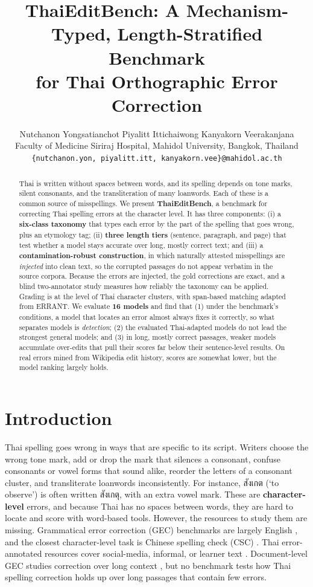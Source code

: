\documentclass[11pt]{article}
\title{ThaiEditBench: A Mechanism-Typed, Length-Stratified Benchmark\\
       for Thai Orthographic Error Correction}
\author{Nutchanon Yongsatianchot \quad Piyalitt Ittichaiwong \quad Kanyakorn Veerakanjana \\
        Faculty of Medicine Siriraj Hospital, Mahidol University, Bangkok, Thailand \\
        \texttt{\{nutchanon.yon, piyalitt.itt, kanyakorn.vee\}@mahidol.ac.th}}
\begin{document}
\maketitle

\begin{abstract}
Thai is written without spaces between words, and its spelling depends on tone marks, silent
consonants, and the transliteration of many loanwords. Each of these is a common source of
misspellings. We present \textbf{ThaiEditBench}, a benchmark for correcting Thai spelling errors
at the character level. It has three components: (i) a \textbf{six-class taxonomy} that types
each error by the part of the spelling that goes wrong, plus an etymology tag; (ii) \textbf{three
length tiers} (sentence, paragraph, and page) that test whether a model stays accurate over long,
mostly correct text; and (iii) a \textbf{contamination-robust construction}, in which naturally
attested misspellings are \emph{injected} into clean text, so the corrupted passages do not
appear verbatim in the source corpora.
Because the errors are injected, the gold corrections are exact, and a blind two-annotator study
measures how reliably the taxonomy can be applied. Grading is at the level of Thai character
clusters, with span-based matching adapted from ERRANT. We evaluate \textbf{16 models} and find
that (1) under the benchmark's conditions, a model that locates an error almost always fixes it
correctly, so what separates models is \emph{detection}; (2) the evaluated Thai-adapted models do
not lead the strongest general models; and (3) in long, mostly correct passages, weaker models
accumulate over-edits that pull their scores far below their sentence-level results. On real errors
mined from Wikipedia edit history, scores are somewhat lower, but the model ranking largely
holds.
\end{abstract}

\section{Introduction}

Thai spelling goes wrong in ways that are specific to its script. Writers choose the wrong tone
mark, add or drop the mark that silences a consonant, confuse consonants or vowel forms that
sound alike, reorder the letters of a consonant cluster, and transliterate loanwords
inconsistently. For instance, สังเกต (`to observe') is often written สังเกตุ, with an extra vowel
mark. These are \textbf{character-level} errors, and because Thai has no spaces between words,
they are hard to locate and score with word-based tools. However, the resources to study them are
missing. Grammatical error correction (GEC) benchmarks are largely English
\citep{bryant-etal-2017-automatic,bryant-etal-2019-bea,napoles-etal-2017-jfleg}, and the closest
character-level task is Chinese spelling check (CSC)
\citep{tseng-etal-2015-introduction,liu-etal-2011-visually}. Thai error-annotated resources
cover social-media, informal, or learner text
\citep{lertpiya-etal-2020-thai,nakwijit-purver-2022-misspelling}. Document-level GEC studies
correction over long context \citep{yuan-bryant-2021-document}, but no benchmark tests how Thai
spelling correction holds up over long passages that contain few errors.
\end{document}

